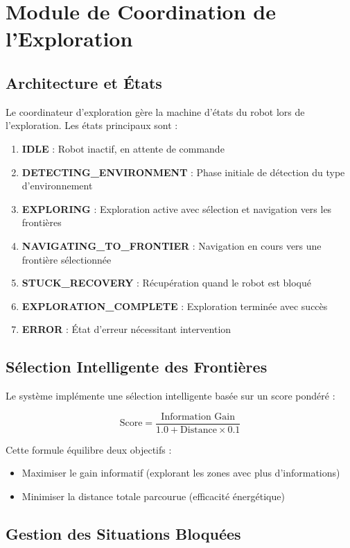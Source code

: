 \documentclass[12pt,a4paper,oneside]{report}
\begin{document}
\section{Module de Coordination de l'Exploration}

\subsection{Architecture et États}

Le coordinateur d'exploration gère la machine d'états du robot lors de l'exploration. Les états principaux sont :

\begin{enumerate}
  \item \textbf{IDLE} : Robot inactif, en attente de commande
  \item \textbf{DETECTING\_ENVIRONMENT} : Phase initiale de détection du type d'environnement
  \item \textbf{EXPLORING} : Exploration active avec sélection et navigation vers les frontières
  \item \textbf{NAVIGATING\_TO\_FRONTIER} : Navigation en cours vers une frontière sélectionnée
  \item \textbf{STUCK\_RECOVERY} : Récupération quand le robot est bloqué
  \item \textbf{EXPLORATION\_COMPLETE} : Exploration terminée avec succès
  \item \textbf{ERROR} : État d'erreur nécessitant intervention
\end{enumerate}

\subsection{Sélection Intelligente des Frontières}

Le système implémente une sélection intelligente basée sur un score pondéré :

$$\text{Score} = \frac{\text{Information Gain}}{1.0 + \text{Distance} \times 0.1}$$

Cette formule équilibre deux objectifs :
\begin{itemize}
  \item Maximiser le gain informatif (explorant les zones avec plus d'informations)
  \item Minimiser la distance totale parcourue (efficacité énergétique)
\end{itemize}

\subsection{Gestion des Situations Bloquées}
\end{document}
